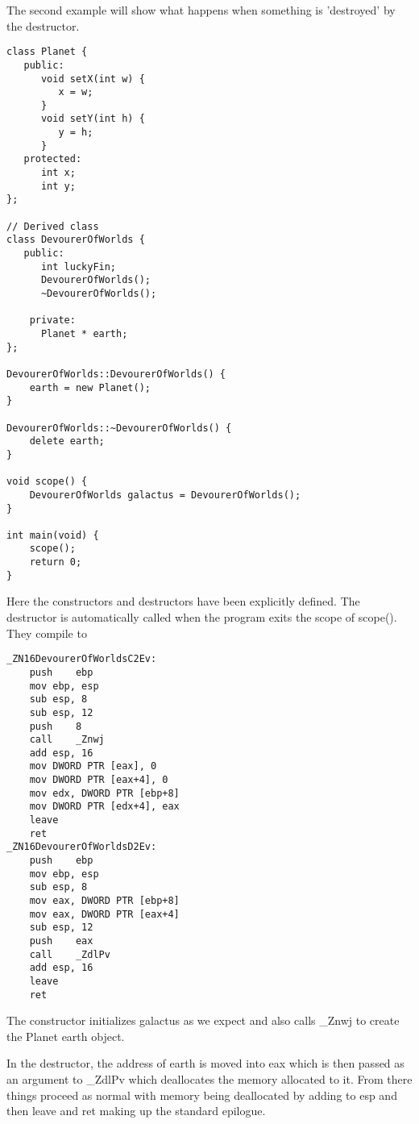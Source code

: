 \documentclass{article}
\begin{document}
The second example will show what happens when something is 'destroyed' by the destructor.
\begin{lstlisting}
class Planet {
   public:
      void setX(int w) {
         x = w;
      }
      void setY(int h) {
         y = h;
      }
   protected:
      int x;
      int y;
};

// Derived class
class DevourerOfWorlds {
   public:
      int luckyFin;
      DevourerOfWorlds();
      ~DevourerOfWorlds();

    private:
      Planet * earth;
};

DevourerOfWorlds::DevourerOfWorlds() {
    earth = new Planet();
}

DevourerOfWorlds::~DevourerOfWorlds() {
    delete earth;
}

void scope() {
    DevourerOfWorlds galactus = DevourerOfWorlds();
}

int main(void) {
    scope();
    return 0;
}

\end{lstlisting}
Here the constructors and destructors have been explicitly defined. The destructor is automatically called when the program exits the scope of scope(). They compile to
\begin{lstlisting}
_ZN16DevourerOfWorldsC2Ev:
	push	ebp
	mov	ebp, esp
	sub	esp, 8
	sub	esp, 12
	push	8
	call	_Znwj
	add	esp, 16
	mov	DWORD PTR [eax], 0
	mov	DWORD PTR [eax+4], 0
	mov	edx, DWORD PTR [ebp+8]
	mov	DWORD PTR [edx+4], eax
	leave
	ret
_ZN16DevourerOfWorldsD2Ev:
	push	ebp
	mov	ebp, esp
	sub	esp, 8
	mov	eax, DWORD PTR [ebp+8]
	mov	eax, DWORD PTR [eax+4]
	sub	esp, 12
	push	eax
	call	_ZdlPv
	add	esp, 16
	leave
	ret
\end{lstlisting}
The constructor initializes galactus as we expect and also calls _Znwj to create the Planet earth object. 

In the destructor, the address of earth is moved into eax which is then passed as an argument to _ZdlPv which deallocates the memory allocated to it. From there things proceed as normal with memory being deallocated by adding to esp and then leave and ret making up the standard epilogue.
\end{document}
